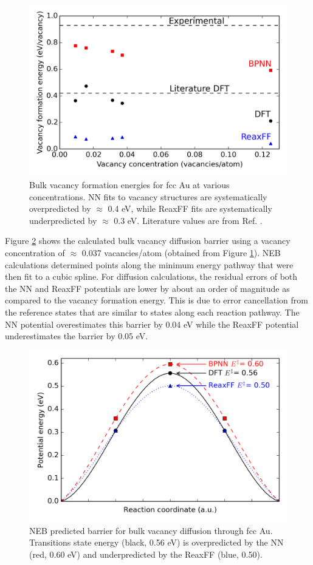 \documentclass[12pt]{cmuthesis}
\begin{document}
\begin{figure}[h]
\centering
\includegraphics[width=5in]{./images/fig-vacancy-formation.png}
\caption{\label{fig-vacancy-formation}
Bulk vacancy formation energies for fcc Au at various concentrations. NN fits to vacancy structures are systematically overpredicted by \(\approx\) 0.4 eV, while ReaxFF fits are systematically underpredicted by \(\approx\) 0.3 eV. Literature values are from Ref. .}
\end{figure}

Figure \ref{fig-vacancy-diffusion} shows the calculated bulk vacancy diffusion barrier using a vacancy concentration of \(\approx\) 0.037 vacancies/atom (obtained from Figure \ref{fig-vacancy-formation}). NEB calculations determined points along the minimum energy pathway that were then fit to a cubic spline. For diffusion calculations, the residual errors of both the NN and ReaxFF potentials are lower by about an order of magnitude as compared to the vacancy formation energy. This is due to error cancellation from the reference states that are similar to states along each reaction pathway. The NN potential overestimates this barrier by 0.04 eV while the ReaxFF potential underestimates the barrier by 0.05 eV.

\begin{figure}[h]
\centering
\includegraphics[width=5in]{./images/fig-vacancy-diffusion.png}
\caption{\label{fig-vacancy-diffusion}
NEB predicted barrier for bulk vacancy diffusion through fcc Au. Transitions state energy (black, 0.56 eV) is overpredicted by the NN (red, 0.60 eV) and underpredicted by the ReaxFF (blue, 0.50).}
\end{figure}
\end{document}
